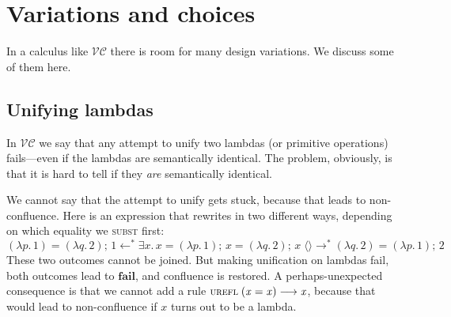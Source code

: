 \documentclass[acmsmall,review,dvipsnames]{acmart}
\newcommand{\Varid}[1]{\mathit{#1}}
\newcommand{\vs}{\emph{vs.}}
\newcommand{\versecalc}{$\mathcal{VC}$}
\newcommand{\rulename}[1]{\textsc{\small #1}}
\newcommand{\movesto}{\longrightarrow}
\newcommand{\movesfrom}{\longleftarrow}
\newcommand{\lennart}[1]{{\color{dkcyan} [{LA}: #1]}}
\newcommand{\lennart}[1]{}
\begin{document}
\section{Variations and choices} \label{sec:variations}


In a calculus like \versecalc{} there is room for many design variations.
We discuss some of them here.

\subsection{Unifying lambdas} \label{sec:unifying-lambda}

In \versecalc{} we say that any attempt to unify two lambdas (or primitive operations) fails---even if the
lambdas are semantically identical.  The problem, obviously, is that it is hard
to tell if they \emph{are} semantically identical.

We cannot say that the attempt to unify gets stuck, because that leads to non-confluence.
Here is an expression that rewrites in two different ways, depending on which equality we \rulename{subst} first:
\[ \ensuremath{(\lambda\Varid{p}.\,\mathrm{1})\mathrel{=}(\lambda\Varid{q}.\,\mathrm{2});\,\mathrm{1}\movesfrom^{\ast}\exists\Varid{x}.\,\Varid{x}\mathrel{=}(\lambda\Varid{p}.\,\mathrm{1});\,\Varid{x}\mathrel{=}(\lambda\Varid{q}.\,\mathrm{2});\,\Varid{x}\;\langle\rangle\movesto^{\ast}(\lambda\Varid{q}.\,\mathrm{2})\mathrel{=}(\lambda\Varid{p}.\,\mathrm{1});\,\mathrm{2}} \]
These two outcomes cannot be joined.  But making unification on lambdas fail, both outcomes
lead to \ensuremath{\textbf{fail}}, and confluence is restored.  A perhaps-unexpected consequence is that we cannot add a rule
$\rulename{urefl}\; \ensuremath{(\Varid{x}\mathrel{=}\Varid{x})} \movesto \ensuremath{\Varid{x}}$, because that would lead to non-confluence if \ensuremath{\Varid{x}} turns out to be a lambda.

\end{document}
